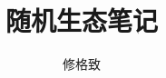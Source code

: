 \documentclass{book}
\title{随机生态笔记}
\author{修格致}
\begin{document}
\begin{titlepage}
    \maketitle
\end{titlepage}

\tableofcontents
\newpage


\end{document}
